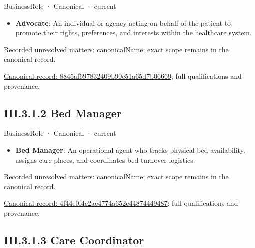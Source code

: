\label{element:8845af697832409b90c51a65d7b06669}
{\small BusinessRole · Canonical · current}\par

\begin{itemize}


\item \textbf{Advocate}: An individual or agency acting on behalf of the patient to promote their rights, preferences, and interests within the healthcare system.

\end{itemize}

{\small Recorded unresolved matters: canonicalName; exact scope remains in the canonical record.}\par
{\footnotesize \href{../../../../../../../continuum/business/business-role/8845af697832409b90c51a65d7b06669.md}{Canonical record: 8845af697832409b90c51a65d7b06669}; full qualifications and provenance.}\par
\subsection*{III.3.1.2 Bed Manager}
\label{navigation:III.3.1.2}

\label{element:4f44e0f4c2ae4774a652c44874449487}
{\small BusinessRole · Canonical · current}\par

\begin{itemize}


\item \textbf{Bed Manager}: An operational agent who tracks physical bed availability, assigns care-places, and coordinates bed turnover logistics.

\end{itemize}

{\small Recorded unresolved matters: canonicalName; exact scope remains in the canonical record.}\par
{\footnotesize \href{../../../../../../../continuum/business/business-role/4f44e0f4c2ae4774a652c44874449487.md}{Canonical record: 4f44e0f4c2ae4774a652c44874449487}; full qualifications and provenance.}\par
\subsection*{III.3.1.3 Care Coordinator}
\label{navigation:III.3.1.3}


